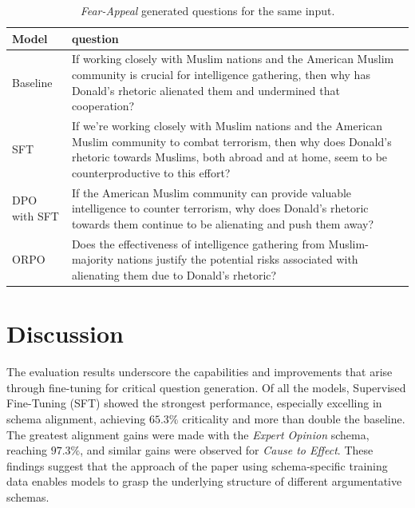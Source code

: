 \documentclass[11pt]{article}
\begin{document}
\begin{table} [H]
    \centering
    \begin{tabular}{p{1.4cm}p{5.5cm}}
    \hline
    \textbf{Model} & \textbf{question}\\
    \hline
     Baseline & If working closely with Muslim nations and the American Muslim community is crucial for intelligence gathering, then why has Donald's rhetoric alienated them and undermined that cooperation?\\
     SFT & If we're working closely with Muslim nations and the American Muslim community to combat terrorism, then why does Donald's rhetoric towards Muslims, both abroad and at home, seem to be counterproductive to this effort?\\
     DPO with SFT & If the American Muslim community can provide valuable intelligence to counter terrorism, why does Donald's rhetoric towards them continue to be alienating and push them away? \\
     ORPO & Does the effectiveness of intelligence gathering from Muslim-majority nations justify the potential risks associated with alienating them due to Donald's rhetoric?\\
    \end{tabular}
    \caption{\textit{Fear-Appeal} generated questions for the same input.}
    \label{tab: example generated questions fear}
\end{table}

\section{Discussion}

The evaluation results underscore the capabilities and improvements that arise through fine-tuning for critical question generation. Of all the models, Supervised Fine-Tuning (SFT) showed the strongest performance, especially excelling in schema alignment, achieving $65.3\%$  criticality and more than double the baseline. The greatest alignment gains were made with the \textit{Expert Opinion} schema, reaching $97.3\%$, and similar gains were observed for \textit{Cause to Effect}. These findings suggest that the approach of the paper using schema-specific training data enables models to grasp the underlying structure of different argumentative schemas.  
 
\end{document}
